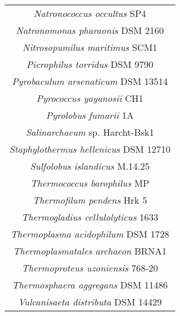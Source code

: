 \begin{table}
\begin{tabular}{|c|}
\textit{Natronococcus occultus} SP4\\
\textit{Natronomonas pharaonis} DSM 2160\\
\textit{Nitrosopumilus maritimus} SCM1\\
\textit{Picrophilus torridus} DSM 9790\\
\textit{Pyrobaculum arsenaticum} DSM 13514\\
\textit{Pyrococcus yayanosii} CH1\\
\textit{Pyrolobus fumarii} 1A\\
\textit{Salinarchaeum} sp. Harcht-Bsk1\\
\textit{Staphylothermus hellenicus} DSM 12710\\
\textit{Sulfolobus islandicus} M.14.25\\
\textit{Thermococcus barophilus} MP\\
\textit{Thermofilum pendens} Hrk 5\\
\textit{Thermogladius cellulolyticus} 1633\\
\textit{Thermoplasma acidophilum} DSM 1728\\
\textit{Thermoplasmatales archaeon} BRNA1\\
\textit{Thermoproteus uzoniensis} 768-20\\
\textit{Thermosphaera aggregans} DSM 11486\\
\textit{Vulcanisaeta distributa} DSM 14429\\
\hline
\end{tabular}
\caption[]{}
\label{tab:edicer_archaea}
\end{table}




